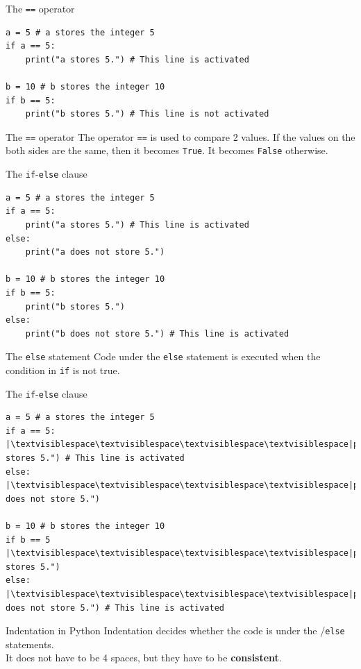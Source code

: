 \documentclass[dvipsnames, svgnames, x11names]{beamer}
\begin{document}
\begin{frame}[fragile]{The \texttt{==} operator}
\begin{verbatim}
a = 5 # a stores the integer 5
if a == 5:
    print("a stores 5.") # This line is activated
    
b = 10 # b stores the integer 10
if b == 5:
    print("b stores 5.") # This line is not activated
\end{verbatim}
\begin{block}{The \texttt{==} operator}
The operator \texttt{==} is used to compare 2 values. If the values on the both sides are the same, then it becomes {\color{blue}\texttt{True}}. It becomes {\color{blue}\texttt{False}} otherwise.
\end{block}
\end{frame}

\begin{frame}[fragile]{The \texttt{if}-\texttt{else} clause}
\begin{verbatim}
a = 5 # a stores the integer 5
if a == 5:
    print("a stores 5.") # This line is activated
else:
    print("a does not store 5.") 
    
b = 10 # b stores the integer 10
if b == 5:
    print("b stores 5.")
else:
    print("b does not store 5.") # This line is activated
\end{verbatim}
\begin{block}{The \texttt{else} statement}
Code under the \texttt{else} statement is executed when the condition in \texttt{if} is not true.
\end{block}
\end{frame}

\begin{frame}[fragile]{The \texttt{if}-\texttt{else} clause}
\begin{verbatim}
a = 5 # a stores the integer 5
if a == 5:
|\textvisiblespace\textvisiblespace\textvisiblespace\textvisiblespace|print("a stores 5.") # This line is activated
else:
|\textvisiblespace\textvisiblespace\textvisiblespace\textvisiblespace|print("a does not store 5.") 
    
b = 10 # b stores the integer 10
if b == 5
|\textvisiblespace\textvisiblespace\textvisiblespace\textvisiblespace|print("b stores 5.")
else:
|\textvisiblespace\textvisiblespace\textvisiblespace\textvisiblespace|print("b does not store 5.") # This line is activated
\end{verbatim}
\begin{block}{Indentation in Python}
Indentation decides whether the code is under the /\texttt{else} statements.\\
It does not have to be 4 spaces, but they have to be \textbf{consistent}.
\end{block}
\end{frame}
\end{document}
